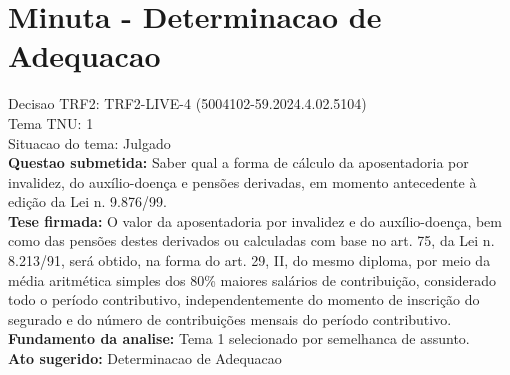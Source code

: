 \documentclass{article}
\begin{document}
\section*{Minuta - Determinacao de Adequacao}
Decisao TRF2: TRF2-LIVE-4 (5004102-59.2024.4.02.5104)\\
Tema TNU: 1\\
Situacao do tema: Julgado\\
\textbf{Questao submetida:} Saber qual a forma de cálculo da aposentadoria por invalidez, do auxílio-doença e pensões derivadas, em momento antecedente à edição da Lei n. 9.876/99.\\
\textbf{Tese firmada:} O valor da aposentadoria por invalidez e do auxílio-doença, bem como das pensões destes derivados ou calculadas com base no art. 75, da Lei n. 8.213/91, será obtido, na forma do art. 29, II, do mesmo diploma, por meio da média aritmética simples dos 80\% maiores salários de contribuição, considerado todo o período contributivo, independentemente do momento de inscrição do segurado e do número de contribuições mensais do período contributivo.\\
\textbf{Fundamento da analise:} Tema 1 selecionado por semelhanca de assunto.\\
\textbf{Ato sugerido:} Determinacao de Adequacao
\end{document}
